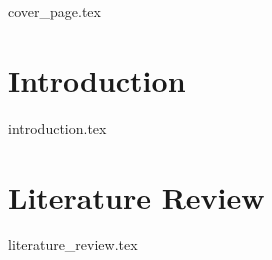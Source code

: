 \documentclass[a4paper, 12pt, oneside]{book}
\begin{document}
\frontmatter
{cover_page.tex}


\tableofcontents

{\let\clearpage\relax
\listoffigures}
{\let\clearpage\relax
\listoftables}
{\let\clearpage\relax
\printglossary[type=\acronymtype
]}

\mainmatter

\onehalfspacing %

\chapter{Introduction}
{introduction.tex}

\chapter{Literature Review}
{literature_review.tex}






\end{document}

